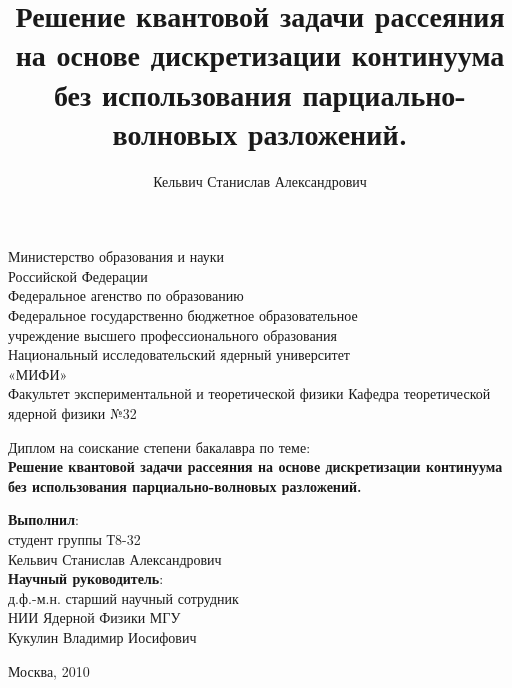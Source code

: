 \documentclass[a4paper,12pt]{article}
\title{Решение квантовой задачи рассеяния на основе дискретизации континуума без использования парциально-волновых разложений.}
\author{Кельвич Станислав Александрович}
\begin{document}
	
	
  \begin{titlepage}
  
  \begin{center}
	Министерство образования и науки \\
	Российской Федерации \\ 
	Федеральное агенство по образованию \\ 
	Федеральное государственно бюджетное образовательное \\
	учреждение высшего профессионального образования \\
	Национальный исследовательский ядерный университет \\
	«МИФИ» \\
	Факультет экспериментальной и теоретической физики
	Кафедра теоретической ядерной физики №32
	\end{center}
	
	\vspace{1cm}
	
	\begin{center}\Large
	Диплом на соискание степени бакалавра по теме: \\
	\bf{Решение квантовой задачи рассеяния на основе дискретизации континуума без использования парциально-волновых разложений.}
  \end{center}
  
  \vspace{1cm}
	
	\begin{flushright}
	\textbf{Выполнил}: \\
	студент группы Т8-32 \\
	Кельвич Станислав Александрович \\
	\vspace{1cm}
	\textbf{Научный руководитель}: \\
	д.ф.-м.н. старший научный сотрудник \\
	НИИ Ядерной Физики МГУ \\
	Кукулин Владимир Иосифович \\
	\end{flushright}
	
	\vspace{1.5cm}
	\begin{center}
	  Москва, 2010
	\end{center}
	
  \end{titlepage}
	\pagebreak
	
\end{document}

